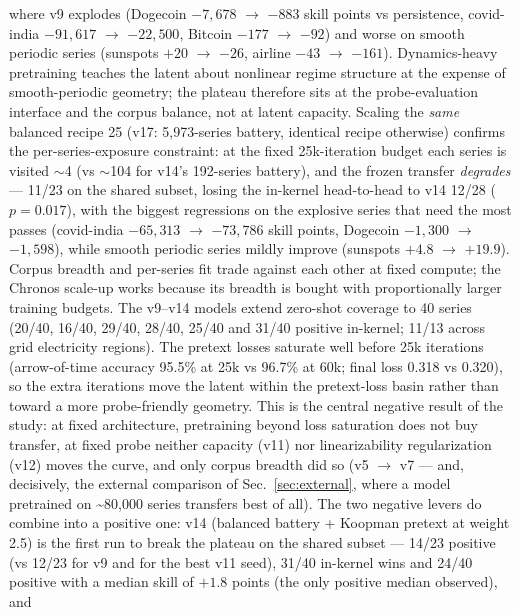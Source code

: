 \documentclass[11pt]{article}
\begin{document}
where v9 explodes (Dogecoin $-7{,}678$ $\rightarrow$ $-883$ skill
points vs persistence, covid-india $-91{,}617$ $\rightarrow$
$-22{,}500$, Bitcoin $-177$ $\rightarrow$ $-92$) and worse on smooth
periodic series (sunspots $+20$ $\rightarrow$ $-26$, airline $-43$
$\rightarrow$ $-161$). Dynamics-heavy pretraining teaches the latent
about nonlinear regime structure at the expense of smooth-periodic
geometry; the plateau therefore sits at the probe-evaluation interface
and the corpus balance, not at latent capacity. Scaling the \emph{same}
balanced recipe 25\texttimes{} (v17: 5{,}973-series battery, identical
recipe otherwise) confirms the per-series-exposure constraint: at the
fixed 25k-iteration budget each series is visited $\sim$4\texttimes{}
(vs $\sim$104\texttimes{} for v14's 192-series battery), and the
frozen transfer \emph{degrades} --- 11/23 on the shared subset, losing
the in-kernel head-to-head to v14 12/28 ($p=0.017$), with the biggest
regressions on the explosive series that need the most passes
(covid-india $-65{,}313$ $\rightarrow$ $-73{,}786$ skill points,
Dogecoin $-1{,}300$ $\rightarrow$ $-1{,}598$), while smooth periodic
series mildly improve (sunspots $+4.8$ $\rightarrow$ $+19.9$). Corpus
breadth and per-series fit trade against each other at fixed compute;
the Chronos scale-up works because its breadth is bought with
proportionally larger training budgets.
The v9--v14 models extend zero-shot coverage to 40 series (20/40, 16/40,
29/40, 28/40, 25/40 and 31/40 positive in-kernel; 11/13 across grid
electricity regions). The pretext losses
saturate well before 25k iterations (arrow-of-time accuracy 95.5\% at
25k vs 96.7\% at 60k; final loss 0.318 vs 0.320), so the extra
iterations move the latent within the pretext-loss basin rather than
toward a more probe-friendly geometry. This is the central negative
result of the study: at fixed architecture, pretraining beyond loss
saturation does not buy transfer, at fixed probe neither capacity
(v11) nor linearizability regularization (v12) moves the curve, and
only corpus breadth did so (v5 $\rightarrow$ v7 --- and, decisively,
the external comparison of Sec.~\ref{sec:external}, where a model
pretrained on \textasciitilde80{,}000 series transfers best of all).
The two negative levers do combine into a positive one: v14 (balanced
battery + Koopman pretext at weight 2.5) is the first run to break the
plateau on the shared subset --- 14/23 positive (vs 12/23 for v9 and
for the best v11 seed), 31/40 in-kernel wins and 24/40 positive with a
median skill of $+1.8$ points (the only positive median observed), and
\end{document}
